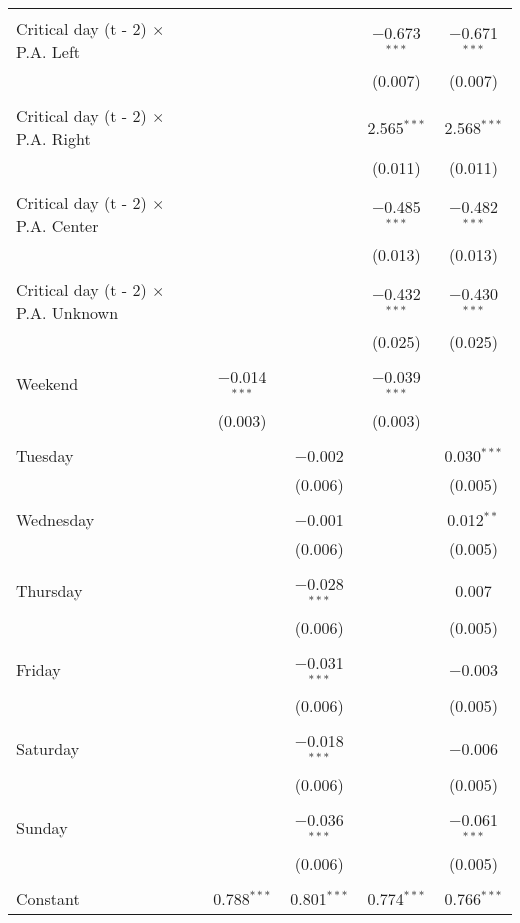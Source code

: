 \documentclass[
]{article}
\begin{document}
\begin{table}[!htbp]
{\begin{tabular}{@{\extracolsep{5pt}}lcccc}
  & & & & \\ 
 Critical day (t - 2) $\times$ P.A. Left &  &  & $-$0.673$^{***}$ & $-$0.671$^{***}$ \\ 
  &  &  & (0.007) & (0.007) \\ 
  & & & & \\ 
 Critical day (t - 2) $\times$ P.A. Right &  &  & 2.565$^{***}$ & 2.568$^{***}$ \\ 
  &  &  & (0.011) & (0.011) \\ 
  & & & & \\ 
 Critical day (t - 2) $\times$ P.A. Center &  &  & $-$0.485$^{***}$ & $-$0.482$^{***}$ \\ 
  &  &  & (0.013) & (0.013) \\ 
  & & & & \\ 
 Critical day (t - 2) $\times$ P.A. Unknown &  &  & $-$0.432$^{***}$ & $-$0.430$^{***}$ \\ 
  &  &  & (0.025) & (0.025) \\ 
  & & & & \\ 
 Weekend & $-$0.014$^{***}$ &  & $-$0.039$^{***}$ &  \\ 
  & (0.003) &  & (0.003) &  \\ 
  & & & & \\ 
 Tuesday &  & $-$0.002 &  & 0.030$^{***}$ \\ 
  &  & (0.006) &  & (0.005) \\ 
  & & & & \\ 
 Wednesday &  & $-$0.001 &  & 0.012$^{**}$ \\ 
  &  & (0.006) &  & (0.005) \\ 
  & & & & \\ 
 Thursday &  & $-$0.028$^{***}$ &  & 0.007 \\ 
  &  & (0.006) &  & (0.005) \\ 
  & & & & \\ 
 Friday &  & $-$0.031$^{***}$ &  & $-$0.003 \\ 
  &  & (0.006) &  & (0.005) \\ 
  & & & & \\ 
 Saturday &  & $-$0.018$^{***}$ &  & $-$0.006 \\ 
  &  & (0.006) &  & (0.005) \\ 
  & & & & \\ 
 Sunday &  & $-$0.036$^{***}$ &  & $-$0.061$^{***}$ \\ 
  &  & (0.006) &  & (0.005) \\ 
  & & & & \\ 
 Constant & 0.788$^{***}$ & 0.801$^{***}$ & 0.774$^{***}$ & 0.766$^{***}$ \\ 

\end{tabular}}
\end{table}
\end{document}
